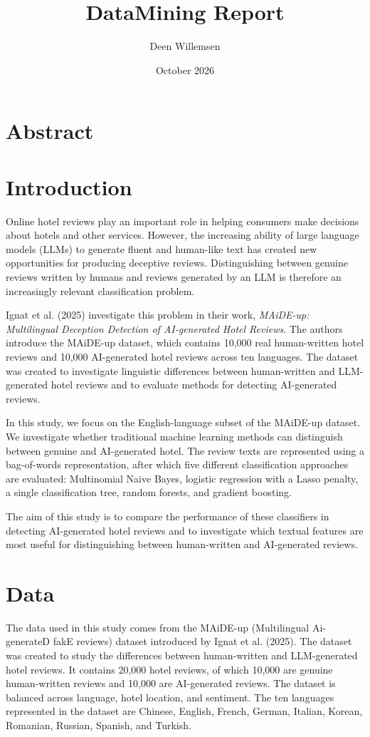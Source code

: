 \documentclass{article}
\title{DataMining Report}
\author{Deen Willemsen }
\date{October 2026}
\begin{document}
\maketitle

\section{Abstract}
\section{Introduction}
Online hotel reviews play an important role in helping consumers make decisions about hotels and other services. However, the increasing ability of large language models (LLMs) to generate fluent and human-like text has created new opportunities for producing deceptive reviews. Distinguishing between genuine reviews written by humans and reviews generated by an LLM is therefore an increasingly relevant classification problem.

Ignat et al. (2025) investigate this problem in their work, \textit{MAiDE-up: Multilingual Deception Detection of AI-generated Hotel Reviews}. The authors introduce the MAiDE-up dataset, which contains 10,000 real human-written hotel reviews and 10,000 AI-generated hotel reviews across ten languages. The dataset was created to investigate linguistic differences between human-written and LLM-generated hotel reviews and to evaluate methods for detecting AI-generated reviews. \cite{ignat-etal-2025-maide}

In this study, we focus on the English-language subset of the MAiDE-up dataset. We investigate whether traditional machine learning methods can distinguish between genuine and AI-generated hotel. The review texts are represented using a bag-of-words representation, after which five different classification approaches are evaluated: Multinomial Naive Bayes, logistic regression with a Lasso penalty, a single classification tree, random forests, and gradient boosting.

The aim of this study is to compare the performance of these classifiers in detecting AI-generated hotel reviews and to investigate which textual features are most useful for distinguishing between human-written and AI-generated reviews.

\section{Data}
The data used in this study comes from the MAiDE-up (Multilingual Ai-generateD fakE reviews) dataset introduced by Ignat et al. (2025). The dataset was created to study the differences between human-written and LLM-generated hotel reviews. It contains 20,000 hotel reviews, of which 10,000 are genuine human-written reviews and 10,000 are AI-generated reviews. The dataset is balanced across language, hotel location, and sentiment. The ten languages represented in the dataset are Chinese, English, French, German, Italian, Korean, Romanian, Russian, Spanish, and Turkish. \cite{ignat-etal-2025-maide}
\end{document}
